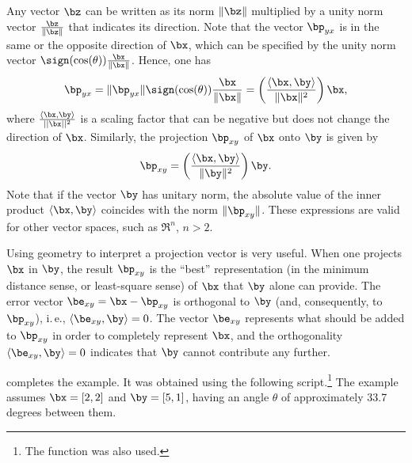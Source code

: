 Any vector $\bz$ can be written as its norm $\lVert\bz\rVert$ multiplied by a unity norm vector $\frac{\bz}{\lVert\bz\rVert}$ that indicates its direction.
Note that the vector $\bp_{yx}$ is in the same or the opposite direction of $\bx$, which can be specified by the unity norm vector $\sign(\cos(\theta)) \frac{\bx}{\lVert\bx\rVert}$. Hence, one has
\[
\bp_{yx} = \lVert\bp_{yx}\rVert \sign(\cos(\theta)) \frac{\bx}{\lVert\bx\rVert} =
\left( \frac{\langle\bx,\by\rangle}{\lVert\bx\rVert^2} \right) \bx,
\]
where $\frac{\langle\bx,\by\rangle}{||\bx||^2}$ is a scaling factor that can be negative but does not change the direction of  $\bx$.
Similarly, the projection $\bp_{xy}$ of $\bx$ onto $\by$ is given by
\[
\bp_{xy} = \left( \frac{\langle\bx,\by\rangle}{\lVert\by\rVert^2} \right) \by.
\]
Note that if the vector $\by$ has unitary norm, the absolute value of the inner product $\langle\bx,\by\rangle$ coincides with the norm $\lVert\bp_{xy}\rVert$.
These expressions are valid for other vector spaces, such as $\Re^n$, $n>2$.

Using geometry to interpret a projection vector is very useful.
When one projects $\bx$ in $\by$, the result $\bp_{xy}$ is the ``best'' representation (in the minimum distance sense, or least-square sense) of $\bx$ that $\by$ alone can provide. The error vector $\be_{xy}=\bx-\bp_{xy}$ is orthogonal to $\by$ (and, consequently, to $\bp_{xy}$), i.\,e., $\langle\be_{xy},\by\rangle=0$. The vector $\be_{xy}$ represents what should be added to $\bp_{xy}$ in order to completely represent $\bx$, and the orthogonality $\langle\be_{xy},\by\rangle=0$ indicates that $\by$ cannot contribute any further.

 completes the example. It was obtained using 
the following {\matlab} script.\footnote{The function  was also used.} The example assumes $\bx=[2,2]$ and $\by=[5,1]$, having an angle $\theta$ of approximately 33.7 degrees between them.

